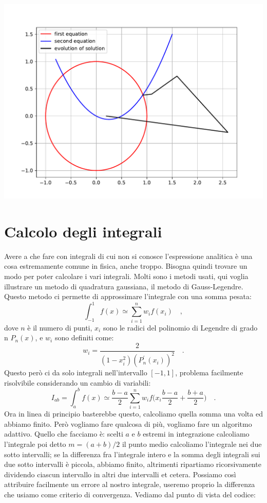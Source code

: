 \documentclass[10pt,a4paper]{article}
\begin{document}
\begin{center}
    \includegraphics[scale=0.85]{img/NR.pdf}
\end{center}

\newpage

\section{Calcolo degli integrali}
Avere a che fare con integrali di cui non si conosce l'espressione analitica è una cosa estremamente comune in fisica, anche troppo. Bisogna quindi trovare un modo per poter calcolare i vari integrali. Molti sono i metodi usati, qui voglia illustrare un metodo di quadratura gaussiana, il metodo di Gauss-Legendre. Questo metodo ci permette di approssimare l'integrale con una somma pesata:
\begin{equation}
\int_{-1}^{1} f(x) \simeq \sum_{i=1}^n w_i f(x_i) \quad,
\end{equation}
dove $n$ è il numero di punti, $x_i$ sono le radici del polinomio di Legendre di grado n $P_n(x)$, e $w_i$ sono definiti come:
\begin{equation}
w_i = \frac{2}{(1-x_i^2)(P_n^{'}(x_i))^2}\quad.
\end{equation}
Questo però ci da solo integrali nell'intervallo $[-1, 1]$, problema facilmente risolvibile considerando un cambio di variabili:
\begin{equation} \label{inte}
I_{ab} = \int_a^b f(x) \simeq \frac{b-a}{2} \sum_{i=1}^n w_i f \Biggl(x_i \frac{b-a}{2} + \frac{b + a}{2} \Biggr) \quad.
\end{equation}
Ora in linea di principio basterebbe questo, calcoliamo quella somma una volta ed abbiamo finito. Però vogliamo fare qualcosa di più, vogliamo fare un algoritmo adattivo. Quello che facciamo è: scelti $a$ e $b$ estremi in integrazione calcoliamo l'integrale poi detto $m=(a+b)/2$ il punto medio calcoliamo l'integrale nei due sotto intervalli; se la differenza fra l'integrale intero e la somma degli integrali sui due sotto intervalli è piccola, abbiamo finito, altrimenti ripartiamo ricorsivamente dividendo ciascun intervallo in altri due intervalli et cetera. Possiamo così attribuire facilmente un errore al nostro integrale, useremo proprio la differenza che usiamo come criterio di convergenza. Vediamo dal punto di vista del codice:
\end{document}

